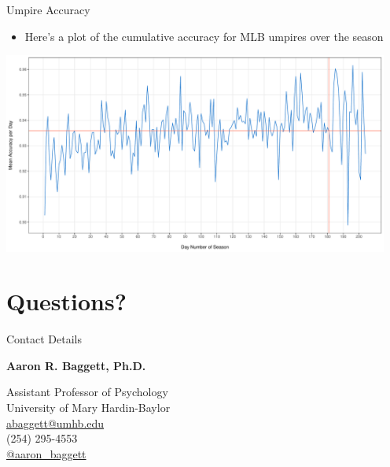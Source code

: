 \documentclass[14pt,ignorenonframetext,aspectratio = 1610]{beamer}
\providecommand{\tightlist}{%
\setlength{\itemsep}{0pt}\setlength{\parskip}{0pt}}
\begin{document}
\begin{frame}{Umpire Accuracy}

\begin{itemize}
\tightlist
\item
  Here's a plot of the cumulative accuracy for MLB umpires over the
  season
\end{itemize}

\vspace{-1mm}\begin{center}
\includegraphics[width = 5in]{../figs/ump_acc_season.pdf}
\end{center}

\end{frame}

\section{Questions?}\label{questions}

\begin{frame}{Contact Details}

\begin{center}
{\Large{\bf{Aaron R. Baggett, Ph.D.}}}

{\small{Assistant Professor of Psychology\\
University of Mary Hardin-Baylor\\
{\large{\faEnvelope}} \url{abaggett@umhb.edu}\\
{\large{\faPhone}} (254) 295-4553\\
{\large{\faTwitter}} \href{http://twitter.com/aaron_baggett}{@aaron\_baggett}}}
\end{center}

\end{frame}
\end{document}
